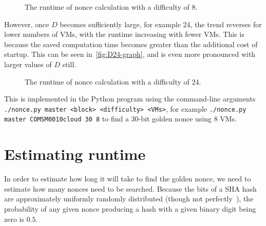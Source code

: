 \documentclass[letterpaper,twocolumn,11pt]{article}
\begin{document}
\begin{figure}
\noindent{}
\caption{The runtime of nonce calculation with a difficulty of 8.}\label{fig:D8-graph}
\end{figure}

However, once $D$ becomes sufficiently large, for example 24, the trend reverses for lower numbers of VMs, with the runtime increasing with fewer VMs. This is because the saved computation time becomes greater than the additional cost of startup. This can be seen in~\autoref{fig:D24-graph}, and is even more pronounced with larger values of $D$ still.

\begin{figure}
\noindent{}
\caption{The runtime of nonce calculation with a difficulty of 24.}\label{fig:D24-graph}
\end{figure}

This is implemented in the Python program using the command-line arguments \texttt{./nonce.py master <block> <difficulty> <VMs>}, for example \verb|./nonce.py master COMSM0010cloud 30 8| to find a 30-bit golden nonce using 8 VMs.

\section{Estimating runtime}

In order to estimate how long it will take to find the golden nonce, we need to estimate how many nonces need to be searched. Because the bits of a SHA hash are approximately uniformly randomly distributed (though not perfectly~\cite{cryptoeprint:2008:441}), the probability of any given nonce producing a hash with a given binary digit being zero is $0.5$.
\end{document}
